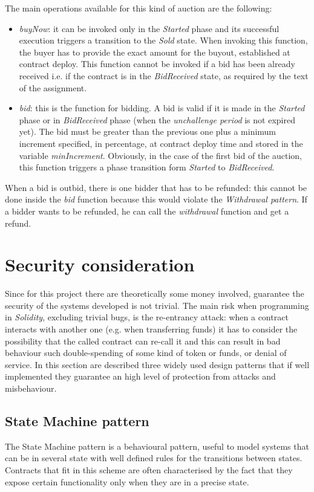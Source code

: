 \documentclass{article}
\begin{document}
The main operations available for this kind of auction are the following:
\begin{itemize}
    \item \textit{buyNow}: it can be invoked only in the \textit{Started} phase and its successful execution triggers a transition to the \textit{Sold} state. When invoking this function, the buyer has to provide the exact amount for the buyout, established at contract deploy. This function cannot be invoked if a bid has been already received i.e. if the contract is in the \textit{BidReceived} state, as required by the text of the assignment.
    \item \textit{bid}: this is the function for bidding. A bid is valid if it is made in the \textit{Started} phase or in \textit{BidReceived} phase (when the \textit{unchallenge period} is not expired yet). The bid must be greater than the previous one plus a minimum increment specified, in percentage, at contract deploy time and stored in the variable \textit{minIncrement}. Obviously, in the case of the first bid of the auction, this function triggers a phase transition form \textit{Started} to \textit{BidReceived}.
    \end{itemize}

When a bid is outbid, there is one bidder that has to be refunded: this cannot be done inside the \textit{bid} function because this would violate the \textit{Withdrawal pattern}. If a bidder wants to be refunded, he can call the \textit{withdrawal} function and get a refund.

\section{Security consideration}\label{security}

Since for this project there are theoretically some money involved, guarantee the security of the systems developed is not trivial. The main risk when programming in \textit{Solidity}, excluding trivial bugs, is the re-entrancy attack: when a contract interacts with another one (e.g. when transferring funds) it has to consider the possibility that the called contract can re-call it and this can result in bad behaviour such double-spending of some kind of token or funds, or denial of service.
In this section are described three widely used design patterns that if well implemented they guarantee an high level of protection from attacks and misbehaviour. 
\subsection{State Machine pattern}\label{statemachine}
The State Machine pattern is a behavioural pattern, useful to model systems that can be in several state with well defined rules for the transitions between states.
Contracts that fit in this scheme are often characterised by the fact that they expose certain functionality only when they are in a precise state.
\end{document}
